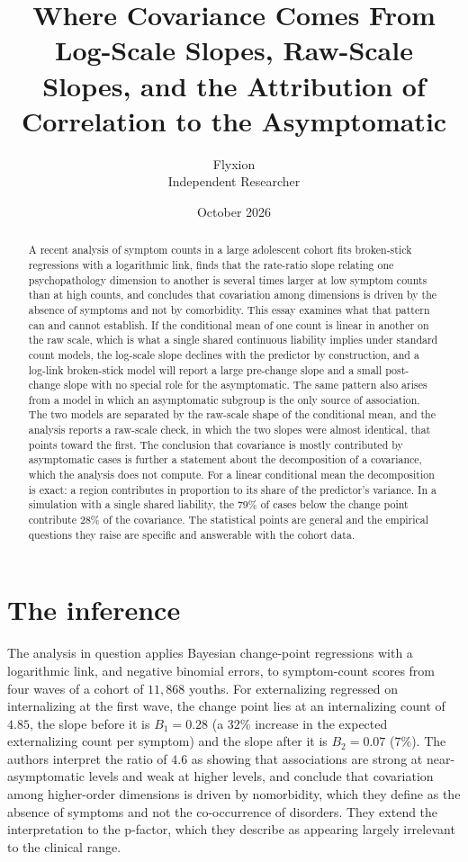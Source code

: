 \documentclass[11pt]{article}
\title{Where Covariance Comes From\\[4pt]
\large Log-Scale Slopes, Raw-Scale Slopes, and the Attribution of Correlation to the Asymptomatic}
\author{Flyxion\\Independent Researcher}
\date{October 2026}
\theoremstyle{definition}
\begin{document}
\maketitle

\begin{abstract}
\noindent
A recent analysis of symptom counts in a large adolescent cohort fits broken-stick regressions with a logarithmic link, finds that the rate-ratio slope relating one psychopathology dimension to another is several times larger at low symptom counts than at high counts, and concludes that covariation among dimensions is driven by the absence of symptoms and not by comorbidity. This essay examines what that pattern can and cannot establish. If the conditional mean of one count is linear in another on the raw scale, which is what a single shared continuous liability implies under standard count models, the log-scale slope declines with the predictor by construction, and a log-link broken-stick model will report a large pre-change slope and a small post-change slope with no special role for the asymptomatic. The same pattern also arises from a model in which an asymptomatic subgroup is the only source of association. The two models are separated by the raw-scale shape of the conditional mean, and the analysis reports a raw-scale check, in which the two slopes were almost identical, that points toward the first. The conclusion that covariance is mostly contributed by asymptomatic cases is further a statement about the decomposition of a covariance, which the analysis does not compute. For a linear conditional mean the decomposition is exact: a region contributes in proportion to its share of the predictor's variance. In a simulation with a single shared liability, the 79\% of cases below the change point contribute 28\% of the covariance. The statistical points are general and the empirical questions they raise are specific and answerable with the cohort data.
\end{abstract}

\section{The inference}

The analysis in question \citep{watts2026} applies Bayesian change-point regressions with a logarithmic link, and negative binomial errors, to symptom-count scores from four waves of a cohort of $11{,}868$ youths. For externalizing regressed on internalizing at the first wave, the change point lies at an internalizing count of $4.85$, the slope before it is $B_1=0.28$ (a $32\%$ increase in the expected externalizing count per symptom) and the slope after it is $B_2=0.07$ ($7\%$). The authors interpret the ratio of $4.6$ as showing that associations are strong at near-asymptomatic levels and weak at higher levels, and conclude that covariation among higher-order dimensions is driven by nomorbidity, which they define as the absence of symptoms and not the co-occurrence of disorders. They extend the interpretation to the p-factor, which they describe as appearing largely irrelevant to the clinical range.
\end{document}
